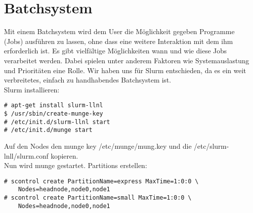 \chapter{Batchsystem}
Mit einem Batchsystem wird dem User die Möglichkeit gegeben Programme (Jobs)
ausführen zu lassen, ohne dass eine weitere Interaktion mit dem ihm erforderlich
ist.
Es gibt vielfältige Möglichkeiten wann und wie diese Jobs 
verarbeitet werden. Dabei spielen unter anderem Faktoren wie Systemauslastung und
Prioritäten eine Rolle.
Wir haben uns für Slurm entschieden, da es ein weit verbreitetes,
einfach zu handhabendes Batchsystem ist.\\
Slurm installieren:
\begin{lstlisting}[style=Bash]
# apt-get install slurm-llnl
$ /usr/sbin/create-munge-key
# /etc/init.d/slurm-llnl start
# /etc/init.d/munge start
\end{lstlisting}
Auf den Nodes den munge key /etc/munge/mung.key und die /etc/slurm-lnll/slurm.conf kopieren.\\
Nun wird munge gestartet.
Partitions erstellen:
\begin{lstlisting}[style=Bash]
# scontrol create PartitionName=express MaxTime=1:0:0 \
	Nodes=headnode,node0,node1
# scontrol create PartitionName=small MaxTime=1:0:0 \
	Nodes=headnode,node0,node1
\end{lstlisting}
